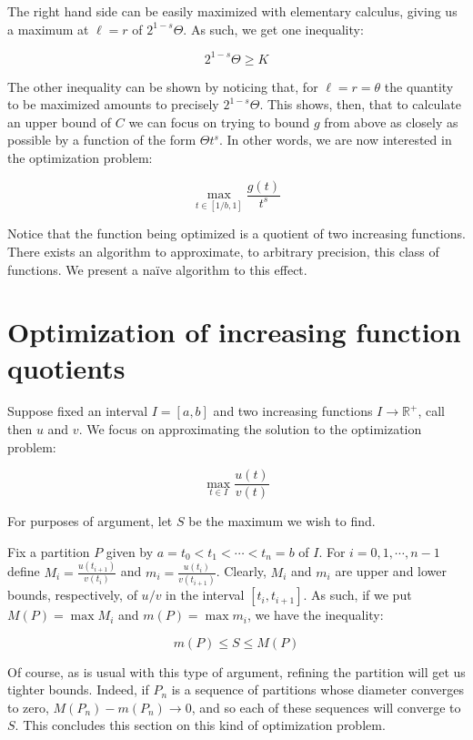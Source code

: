 \documentclass[11pt]{amsart}
\newcommand{\R}{\mathbb{R}}
\begin{document}
The right hand side can be easily maximized with elementary calculus, giving us a maximum at $\ell = r$ of $2^{1-s} \Theta$. As such, we get one inequality:

\[ 2^{1-s} \Theta \geq K \]

The other inequality can be shown by noticing that, for $\ell = r = \theta$ the quantity to be maximized amounts to precisely $2^{1-s} \Theta$. This shows, then, that to calculate an upper bound of $C$ we can focus on trying to bound $g$ from above as closely as possible by a function of the form $\Theta t^s$. In other words, we are now interested in the optimization problem:

\[ \max_{t \in \left[ 1/b, 1 \right]} \frac{g(t)}{t^s} \]

Notice that the function being optimized is a quotient of two increasing functions. There exists an algorithm to approximate, to arbitrary precision, this class of functions. We present a naïve algorithm to this effect.

\section{Optimization of increasing function quotients}

Suppose fixed an interval $I = \left[ a, b \right]$ and two increasing functions $I \to \R^+$, call then $u$ and $v$. We focus on approximating the solution to the optimization problem:

\[ \max_{t \in I} \frac{u(t)}{v(t)} \]

For purposes of argument, let $S$ be the maximum we wish to find.

Fix a partition $P$ given by $a = t_0 < t_1 < \cdots < t_n = b$ of $I$. For $i = 0, 1, \cdots, n-1$ define $M_i = \frac{u(t_{i+1})}{v(t_i)}$ and $m_i = \frac{u(t_i)}{v(t_{i+1})}$. Clearly, $M_i$ and $m_i$ are upper and lower bounds, respectively, of $u/v$ in the interval $\left[t_i, t_{i+1} \right]$. As such, if we put $M(P) = \max M_i$ and $m(P) = \max m_i$, we have the inequality:

\[m(P) \leq S \leq M(P)\]

Of course, as is usual with this type of argument, refining the partition will get us tighter bounds. Indeed, if $P_n$ is a sequence of partitions whose diameter converges to zero, $M(P_n) - m(P_n) \to 0$, and so each of these sequences will converge to $S$. This concludes this section on this kind of optimization problem.
\end{document}
